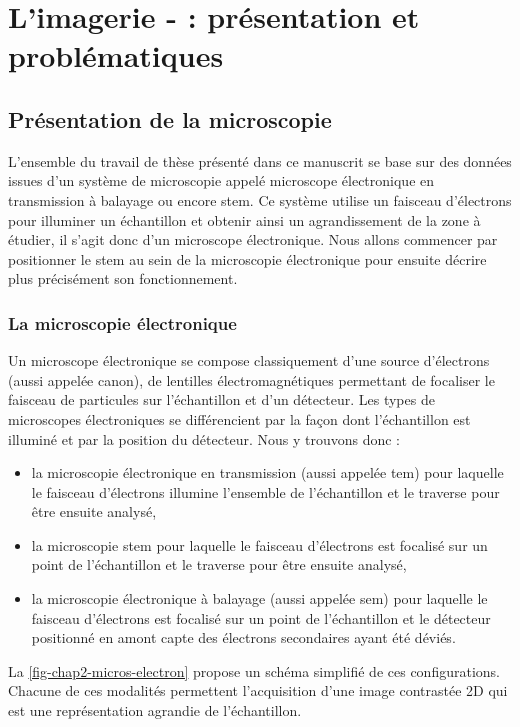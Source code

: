 
\chapter{L'imagerie - : présentation et problématiques}
\label{ch-chapter_1}

    \dochaptoc
    \graphicspath{{img/chapitre1/}}

    \section{Présentation de la microscopie }

    L'ensemble du travail de thèse présenté dans ce manuscrit se base sur des données issues d'un système de microscopie appelé microscope électronique en transmission à balayage ou encore \acf{stem}. Ce système utilise un faisceau d'électrons pour illuminer un échantillon et obtenir ainsi un agrandissement de la zone à étudier, il s'agit donc d'un microscope électronique. Nous allons commencer par positionner le \gls{stem} au sein de la microscopie électronique pour ensuite décrire plus précisément son fonctionnement.

    \subsection{La microscopie électronique}

    Un microscope électronique se compose classiquement d'une source d'électrons (aussi appelée canon), de lentilles électromagnétiques permettant de focaliser le faisceau de particules sur l'échantillon et d'un détecteur. Les types de microscopes électroniques se différencient par la façon dont l'échantillon est illuminé et par la position du détecteur. Nous y trouvons donc :
    \begin{itemize}
    	\item la microscopie électronique en transmission (aussi appelée \gls{tem}) pour laquelle le faisceau d'électrons illumine l'ensemble de l'échantillon et le traverse pour être ensuite analysé,
    	\item la microscopie \gls{stem} pour laquelle le faisceau d'électrons est focalisé sur un point de l'échantillon et le traverse pour être ensuite analysé,
    	\item la microscopie électronique à balayage (aussi appelée \gls{sem}) pour laquelle le faisceau d'électrons est focalisé sur un point de l'échantillon et le détecteur positionné en amont capte des électrons secondaires ayant été déviés.
    \end{itemize}
    La \cref{fig-chap2-micros-electron} propose un schéma simplifié de ces configurations. Chacune de ces modalités permettent l'acquisition d'une image contrastée 2D qui est une représentation agrandie de l'échantillon.


